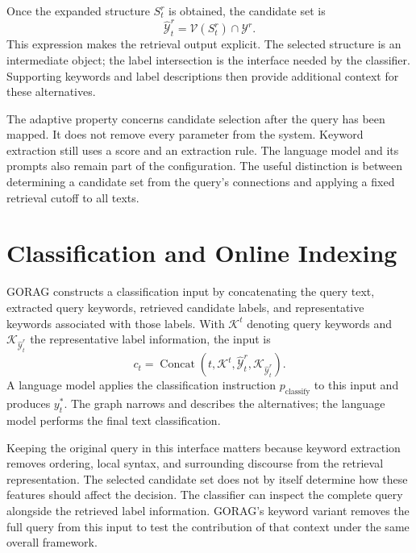 Once the expanded structure $S_t^r$ is obtained, the candidate set is
\begin{equation}
\widehat{\mathcal{Y}}_t^r=\mathcal{V}(S_t^r)\cap\mathcal{Y}^r.
\label{eq:gorag:candidates}
\end{equation}
This expression makes the retrieval output explicit. The selected structure is an intermediate object; the label intersection is the interface needed by the classifier. Supporting keywords and label descriptions then provide additional context for these alternatives.

The adaptive property concerns candidate selection after the query has been mapped. It does not remove every parameter from the system. Keyword extraction still uses a score and an extraction rule. The language model and its prompts also remain part of the configuration. The useful distinction is between determining a candidate set from the query's connections and applying a fixed retrieval cutoff to all texts.

\section{Classification and Online Indexing}
\label{sec:gorag:online}

GORAG constructs a classification input by concatenating the query text, extracted query keywords, retrieved candidate labels, and representative keywords associated with those labels. With $\mathcal{K}^t$ denoting query keywords and $\mathcal{K}_{\widehat{\mathcal{Y}}_t^r}$ the representative label information, the input is
\begin{equation}
c_t=\operatorname{Concat}\left(t,\mathcal{K}^t,\widehat{\mathcal{Y}}_t^r,\mathcal{K}_{\widehat{\mathcal{Y}}_t^r}\right).
\label{eq:gorag:context}
\end{equation}
A language model applies the classification instruction $p_{\mathrm{classify}}$ to this input and produces $y_t^*$. The graph narrows and describes the alternatives; the language model performs the final text classification.

Keeping the original query in this interface matters because keyword extraction removes ordering, local syntax, and surrounding discourse from the retrieval representation. The selected candidate set does not by itself determine how these features should affect the decision. The classifier can inspect the complete query alongside the retrieved label information. GORAG's keyword variant removes the full query from this input to test the contribution of that context under the same overall framework.

